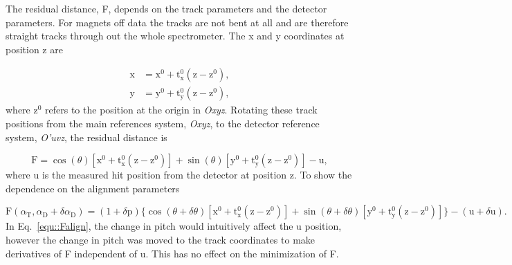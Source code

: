 The residual distance, F, depends on the track parameters and the detector
parameters.  For magnets off data the tracks are not bent at all and are
therefore straight tracks through out the whole spectrometer.  The x and y coordinates at position z are

\begin{align}
  \label{equ::trackPosOff}
  \mathrm{x} &= \mathrm{x}^0 +
  \mathrm{t}_{\mathrm{x}}^0(\mathrm{z}-\mathrm{z}^0), \\
  \mathrm{y} &=
  \mathrm{y}^0 + \mathrm{t}_{\mathrm{y}}^0(\mathrm{z}-\mathrm{z}^0),
\end{align}
\noindent
where z$^0$ refers to the position at the origin in \textit{Oxyz}.
Rotating these track positions from the main references system, \textit{Oxyz},
to the detector reference system, \textit{O'uvz}, the residual distance is

\begin{equation}
\mathrm{F} = \cos(\theta)[\mathrm{x}^0 +
  \mathrm{t}_{\mathrm{x}}^0(\mathrm{z}-\mathrm{z}^0)] +
\sin(\theta)[\mathrm{y}^0 + \mathrm{t}_{\mathrm{y}}^0(\mathrm{z}-\mathrm{z}^0)]
- \mathrm{u},
\end{equation}
\noindent
where u is the measured hit position from the detector at position z.  To show
the dependence on the alignment parameters

\begin{dmath} \label{equ::Falign}
  \mathrm{F}(\alpha_{\mathrm{T}}, \alpha_{\mathrm{D}}+\delta\alpha_{\mathrm{D}})
  = (1+\delta \mathrm{p})
  \Big \{ \cos(\theta + \delta \theta)
       [\mathrm{x}^0 + \mathrm{t}^0_{\mathrm{x}}(\mathrm{z}-\mathrm{z}^0)] +
       \sin(\theta + \delta \theta)[\mathrm{y}^0 + \mathrm{t}^0_{\mathrm{y}}
         (\mathrm{z}-\mathrm{z}^0)] \Big \} -
       (\mathrm{u} + \delta \mathrm{u}).
\end{dmath}
\noindent
In Eq.~\ref{equ::Falign}, the change in pitch would intuitively affect the u
position, however the change in pitch was moved to the track coordinates to make
derivatives of F independent of u.  This has no effect on the minimization of F.

